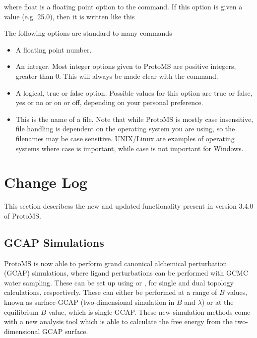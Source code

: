 \documentclass[letterpaper,10pt,english]{sphinxmanual}
\begin{document}
where float is a floating point option to the command. If this option is given a value (e.g. 25.0), then it is written like this

%
\begin{sphinxVerbatim}[commandchars=\\\{\}]
 
\end{sphinxVerbatim}

The following options are standard to many commands
\begin{itemize}
\item {} 
 A floating point number.

\item {} 
 An integer. Most integer options given to ProtoMS are positive integers, greater than 0. This will always be made clear with the command.

\item {} 
 A logical, true or false option. Possible values for this option are true or false, yes or no or on or off, depending on your personal preference.

\item {} 
 This is the name of a file. Note that while ProtoMS is mostly case insensitive, file handling is dependent on the operating system you are using, so the filenames may be case sensitive. UNIX/Linux are examples of operating systems where case is important, while case is not important for Windows.

\end{itemize}


\chapter{Change Log}
\label{\detokenize{changelog::doc}}\label{\detokenize{changelog:change-log}}
This section describess the new and updated functionality present in version 3.4.0 of ProtoMS.


\section{GCAP Simulations}
\label{\detokenize{changelog:gcap-simulations}}
ProtoMS is now able to perform grand canonical alchemical perturbation (GCAP) simulations, where ligand perturbations can be performed with GCMC water sampling. These can be set up using  or , for single and dual topology calculations, respectively. These can either be performed at a range of \(B\) values, known as surface-GCAP (two-dimensional simulation in \(B\) and \(\lambda\)) or at the equilibrium \(B\) value, which is single-GCAP. These new simulation methods come with a new analysis tool  which is able to calculate the free energy from the two-dimensional GCAP surface.
\end{document}
